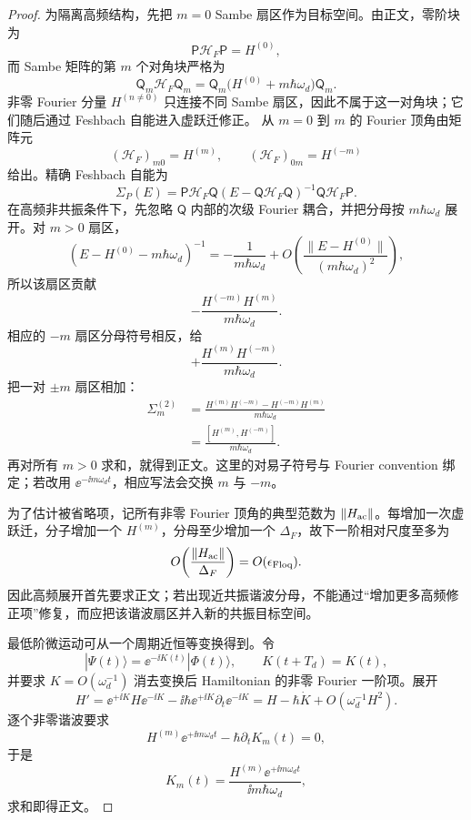 \begin{proof}
为隔离高频结构，先把 $m=0$ Sambe 扇区作为目标空间。由正文，零阶块为
\[
\mathsf P\mathcal H_F\mathsf P=H^{(0)},
\]
而 Sambe 矩阵的第 $m$ 个对角块严格为
\[
\mathsf Q_m\mathcal H_F\mathsf Q_m
=\mathsf Q_m\bigl(H^{(0)}+m\hbar\omega_d\bigr)\mathsf Q_m.
\]
非零 Fourier 分量 $H^{(n\ne0)}$ 只连接不同 Sambe 扇区，因此不属于这一对角块；它们随后通过 Feshbach 自能进入虚跃迁修正。
从 $m=0$ 到 $m$ 的 Fourier 顶角由矩阵元
\[
(\mathcal H_F)_{m0}=H^{(m)},
\qquad
(\mathcal H_F)_{0m}=H^{(-m)}
\]
给出。精确 Feshbach 自能为
\[
\Sigma_P(E)
=\mathsf P\mathcal H_F\mathsf Q
(E-\mathsf Q\mathcal H_F\mathsf Q)^{-1}
\mathsf Q\mathcal H_F\mathsf P.
\]
在高频非共振条件下，先忽略 $\mathsf Q$ 内部的次级 Fourier 耦合，并把分母按 $m\hbar\omega_d$ 展开。对 $m>0$ 扇区，
\[
(E-H^{(0)}-m\hbar\omega_d)^{-1}
=-\frac1{m\hbar\omega_d}
+O\!\left(\frac{\|E-H^{(0)}\|}{(m\hbar\omega_d)^2}\right),
\]
所以该扇区贡献
\[
-\frac{H^{(-m)}H^{(m)}}{m\hbar\omega_d}.
\]
相应的 $-m$ 扇区分母符号相反，给
\[
+\frac{H^{(m)}H^{(-m)}}{m\hbar\omega_d}.
\]
把一对 $\pm m$ 扇区相加：
\begin{align*}
\Sigma_m^{(2)}
&=\frac{H^{(m)}H^{(-m)}-H^{(-m)}H^{(m)}}
{m\hbar\omega_d}\\
&=\frac{[H^{(m)},H^{(-m)}]}
{m\hbar\omega_d}.
\end{align*}
再对所有 $m>0$ 求和，就得到正文。这里的对易子符号与 Fourier convention 绑定；若改用 $\ee^{-\ii m\omega_dt}$，相应写法会交换 $m$ 与 $-m$。

为了估计被省略项，记所有非零 Fourier 顶角的典型范数为 $\|H_{\rm ac}\|$。每增加一次虚跃迁，分子增加一个 $H^{(m)}$，分母至少增加一个 $\Delta_F$，故下一阶相对尺度至多为
\[
O\!\left(\frac{\|H_{\rm ac}\|}{\Delta_F}\right)
=O(\epsilon_{\rm Floq}).
\]
因此高频展开首先要求正文；若出现近共振谐波分母，不能通过“增加更多高频修正项”修复，而应把该谐波扇区并入新的共振目标空间。

最低阶微运动可从一个周期近恒等变换得到。令
\[
|\Psi(t)\rangle=\ee^{-\ii K(t)}|\Phi(t)\rangle,
\qquad K(t+T_d)=K(t),
\]
并要求 $K=O(\omega_d^{-1})$ 消去变换后 Hamiltonian 的非零 Fourier 一阶项。展开
\[
H'=
\ee^{+\ii K}H\ee^{-\ii K}
-\ii\hbar\ee^{+\ii K}\partial_t\ee^{-\ii K}
=H-\hbar\dot K+O(\omega_d^{-1}H^2).
\]
逐个非零谐波要求
\[
H^{(m)}\ee^{+\ii m\omega_dt}
-\hbar\partial_tK_m(t)=0,
\]
于是
\[
K_m(t)=\frac{H^{(m)}\ee^{+\ii m\omega_dt}}
{\ii m\hbar\omega_d},
\]
求和即得正文。
\end{proof}


